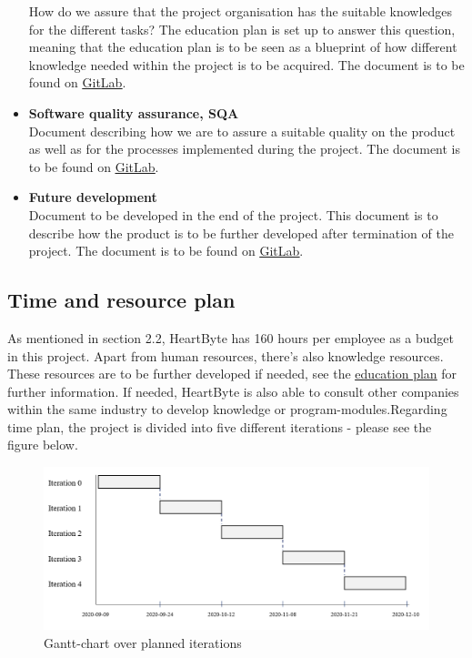 \begin{itemize}
    How do we assure that the project organisation has the suitable knowledges for the different tasks? The education plan is set up to answer this question, meaning that the education plan is to be seen as a blueprint of how different knowledge needed within the project is to be acquired. The document is to be found on \href{https://gitlab.liu.se/tddc88-company-3-2020/deploy/-/tree/Document_branch/Education_plan}{\underline{GitLab}}. 
    \item{\textbf{Software quality assurance, SQA}} \\
    Document describing how we are to assure a suitable quality on the product as well as for the processes implemented during the project. The document is to be found on \href{https://gitlab.liu.se/tddc88-company-3-2020/deploy/-/tree/Document_branch/Quality_Assurance_Plan}{\underline{GitLab}}.
    \item{\textbf{Future development}} \\
    Document to be developed in the end of the project. This document is to describe how the product is to be further developed after termination of the project. The document is to be found on \href{https://gitlab.liu.se/tddc88-company-3-2020/deploy/-/tree/Document_branch}{\underline{GitLab}}.
\end{itemize}
\subsection{Time and resource plan}
As mentioned in section 2.2, HeartByte has 160 hours per employee as a budget in this project. Apart from human resources, there's also knowledge resources. These resources are to be further developed if needed, see the \href{https://gitlab.liu.se/tddc88-company-3-2020/deploy/-/tree/Document_branch/Education_plan}{\underline{education plan}} for further information. If needed, HeartByte is also able to consult other companies within the same industry to develop knowledge or program-modules.Regarding time plan, the project is divided into five different iterations - please see the figure below. 

\begin{figure}[H]
\centering
\includegraphics[width=\linewidth]{Pictures/all_iterations.jpeg}
\caption{Gantt-chart over planned iterations}
\label{fig:all_iterations}
\end{figure}
   
